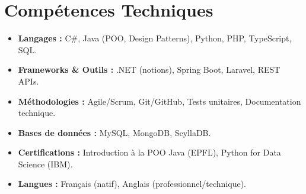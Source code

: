 \documentclass[a4paper,11pt]{article}
\begin{document}
\section{Compétences Techniques}
\begin{itemize}[leftmargin=*, nosep]
    \item \small{\textbf{Langages :} C\#, Java (POO, Design Patterns), Python, PHP, TypeScript, SQL.}
    \item \small{\textbf{Frameworks \& Outils :} .NET (notions), Spring Boot, Laravel, REST APIs.}
    \item \small{\textbf{Méthodologies :} Agile/Scrum, Git/GitHub, Tests unitaires, Documentation technique.}
    \item \small{\textbf{Bases de données :} MySQL, MongoDB, ScyllaDB.}
    \item \small{\textbf{Certifications :} Introduction à la POO Java (EPFL), Python for Data Science (IBM).}
    \item \small{\textbf{Langues :} Français (natif), Anglais (professionnel/technique).}
\end{itemize}

\end{document}

